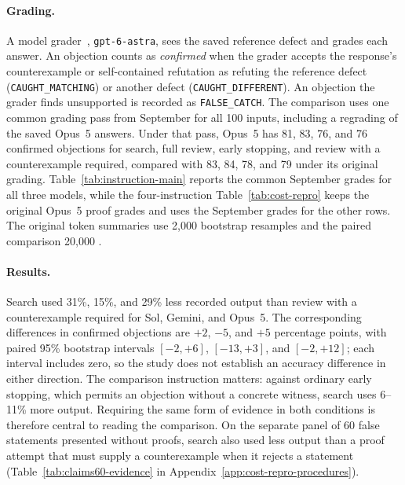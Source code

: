\paragraph{Grading.}
A model grader~\citep{zheng2023judging}, \texttt{gpt-6-astra}, sees the saved reference defect and grades each answer. An objection counts as \emph{confirmed} when the grader accepts the response's counterexample or self-contained refutation as refuting the reference defect (\texttt{CAUGHT\_MATCHING}) or another defect (\texttt{CAUGHT\_DIFFERENT}). An objection the grader finds unsupported is recorded as \texttt{FALSE\_CATCH}. The comparison uses one common grading pass from September for all 100 inputs, including a regrading of the saved Opus~5 answers. Under that pass, Opus~5 has 81, 83, 76, and 76 confirmed objections for search, full review, early stopping, and review with a counterexample required, compared with 83, 84, 78, and 79 under its original grading. Table~\ref{tab:instruction-main} reports the common September grades for all three models, while the four-instruction Table~\ref{tab:cost-repro} keeps the original Opus~5 proof grades and uses the September grades for the other rows. The original token summaries use 2,000 bootstrap resamples and the paired comparison 20,000 \citep{efron1979bootstrap}.



\paragraph{Results.}
Search used 31\%, 15\%, and 29\% less recorded output than review with a counterexample required for Sol, Gemini, and Opus~5. The corresponding differences in confirmed objections are $+2$, $-5$, and $+5$ percentage points, with paired 95\% bootstrap intervals $[-2,+6]$, $[-13,+3]$, and $[-2,+12]$; each interval includes zero, so the study does not establish an accuracy difference in either direction. The comparison instruction matters: against ordinary early stopping, which permits an objection without a concrete witness, search uses 6--11\% more output. Requiring the same form of evidence in both conditions is therefore central to reading the comparison. On the separate panel of 60 false statements presented without proofs, search also used less output than a proof attempt that must supply a counterexample when it rejects a statement (Table~\ref{tab:claims60-evidence} in Appendix~\ref{app:cost-repro-procedures}).

